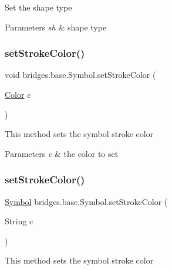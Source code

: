 Set the shape type 
\begin{DoxyParams}{Parameters}
{\em sh} & shape type \\
\hline
\end{DoxyParams}
\mbox{\label{classbridges_1_1base_1_1_symbol_a387a5a5691e55e84a1d0367ca2066806}} 
\subsubsection{\texorpdfstring{set\+Stroke\+Color()}{setStrokeColor()}\hspace{0.1cm}{\footnotesize\ttfamily [1/2]}}
{\footnotesize\ttfamily void bridges.\+base.\+Symbol.\+set\+Stroke\+Color (\begin{DoxyParamCaption}\item[{\mbox{\hyperlink{classbridges_1_1base_1_1_color}{Color}}}]{c }\end{DoxyParamCaption})}

This method sets the symbol stroke color


\begin{DoxyParams}{Parameters}
{\em c} & the color to set \\
\hline
\end{DoxyParams}
\mbox{\label{classbridges_1_1base_1_1_symbol_ae9aa7d4e9b497875017a9b6e0eaab181}} 
\subsubsection{\texorpdfstring{set\+Stroke\+Color()}{setStrokeColor()}\hspace{0.1cm}{\footnotesize\ttfamily [2/2]}}
{\footnotesize\ttfamily \mbox{\hyperlink{classbridges_1_1base_1_1_symbol}{Symbol}} bridges.\+base.\+Symbol.\+set\+Stroke\+Color (\begin{DoxyParamCaption}\item[{String}]{c }\end{DoxyParamCaption})}

This method sets the symbol stroke color


